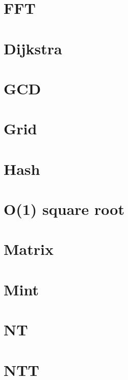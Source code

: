 \documentclass{article}
\begin{document}
%

\section{FFT}

\pagebreak

\section{Dijkstra}

\pagebreak

\section{GCD}

\pagebreak

\section{Grid}

\pagebreak

\section{Hash}

\pagebreak

\section{O(1) square root}

\pagebreak

\section{Matrix}

\pagebreak

\section{Mint}

\pagebreak

\section{NT}

\pagebreak

\section{NTT}

\pagebreak
\end{document}
